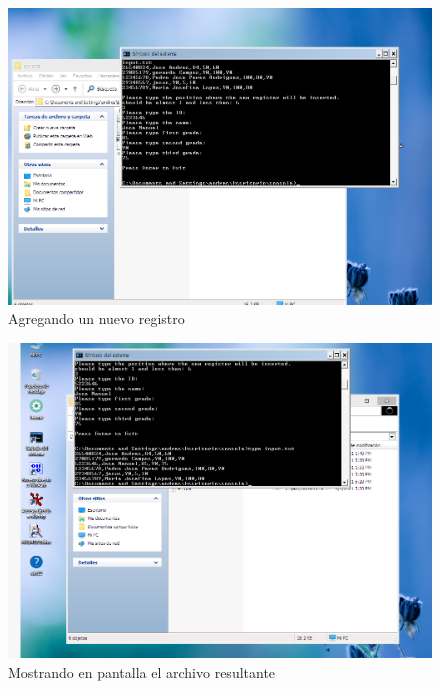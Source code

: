\begin{figure}[H]
  \includegraphics[width=\linewidth]{practica5/img/fig2}
    \caption{Agregando un nuevo registro}
\end{figure}

\begin{figure}[H]
  \includegraphics[width=\linewidth]{practica5/img/fig3}
    \caption{Mostrando en pantalla el archivo resultante}
\end{figure}
